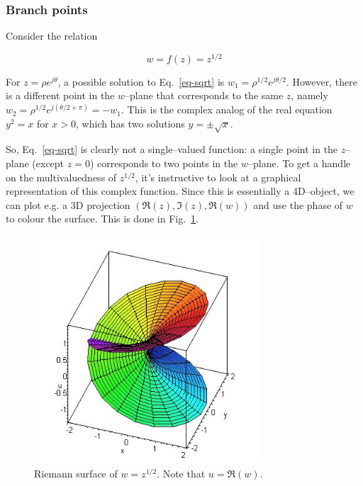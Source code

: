 \subsubsection*{Branch points}

Consider the relation

\begin{equation}
w = f(z) = z^{1/2} \label{eq-sqrt}
\end{equation} 

For $z=\rho e^{j\theta}$, a possible solution to Eq.~\ref{eq-sqrt} is $w_1 =
\rho^{1/2} e^{j\theta/2}$. However, there is a different point in the $w$--plane
that corresponds to the same $z$, namely $w_2 = \rho^{1/2} e^{j(\theta/2+\pi)} =
-w_1$. This is the complex analog of the real equation $y^2 = x$ for $x > 0$,
which has two solutions $y = \pm \sqrt{x}$.

So, Eq.~\ref{eq-sqrt} is clearly not a single--valued function: a single point
in the $z$--plane (except $z=0$) corresponds to two points in the $w$--plane. To
get a handle on the multivaluedness of $z^{1/2}$, it's instructive to look at a
graphical representation of this complex function. Since this is essentially a
4D--object, we can plot e.g. a 3D projection $(\Re(z),\Im(z),\Re(w))$ and use
the phase of $w$ to colour the surface. This is done in Fig.~\ref{fig-riemann}.

\begin{figure}
\centering
\includegraphics[width=8.5cm]{complex/figures/riemann}
\caption{Riemann surface of $w=z^{1/2}$. Note that $u=\Re(w)$. }
\label{fig-riemann}
\end{figure}

